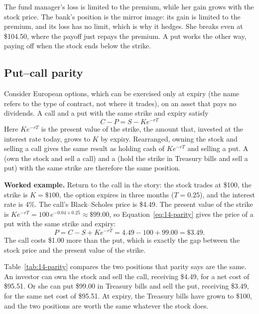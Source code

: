 The fund manager's loss is limited to the premium, while her gain grows with the stock price. The bank's position is the mirror image: its gain is limited to the premium, and its loss has no limit, which is why it hedges. She breaks even at \$104.50, where the payoff just repays the premium. A put works the other way, paying off when the stock ends below the strike.

\subsection{Put--call parity}
\label{sec:14-parity}

Consider European options, which can be exercised only at expiry (the name refers to the type of contract, not where it trades), on an asset that pays no dividends. A call and a put with the same strike and expiry satisfy
\begin{equation}
  C - P = S - K e^{-rT}
  \label{eq:14-parity}
\end{equation}
Here $Ke^{-rT}$ is the present value of the strike, the amount that, invested at the interest rate today, grows to $K$ by expiry. Rearranged, owning the stock and selling a call gives the same result as holding cash of $Ke^{-rT}$ and selling a put. A  (own the stock and sell a call) and a  (hold the strike in Treasury bills and sell a put) with the same strike are therefore the same position.

\textbf{Worked example.} Return to the call in the story: the stock trades at \$100, the strike is $K = \$100$, the option expires in three months ($T = 0.25$), and the interest rate is 4\%. The call's Black--Scholes price is \$4.49. The present value of the strike is $K e^{-rT} = 100\,e^{-0.04 \times 0.25} \approx \$99.00$, so Equation~\eqref{eq:14-parity} gives the price of a put with the same strike and expiry:
\begin{equation}
  P = C - S + K e^{-rT} = 4.49 - 100 + 99.00 = \$3.49.
  \label{eq:14-parity-example}
\end{equation}
The call costs \$1.00 more than the put, which is exactly the gap between the stock price and the present value of the strike.

Table~\ref{tab:14-parity} compares the two positions that parity says are the same. An investor can own the stock and sell the call, receiving \$4.49, for a net cost of \$95.51. Or she can put \$99.00 in Treasury bills and sell the put, receiving \$3.49, for the same net cost of \$95.51. At expiry, the Treasury bills have grown to \$100, and the two positions are worth the same whatever the stock does.


